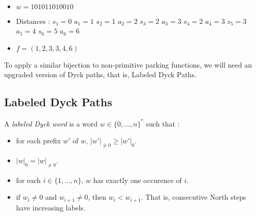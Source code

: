 \begin{example}[$n = 6, \mathcal{D}_n \to \mathcal{PF'}_n$]
    ~\
    \begin{itemize}
        \item $w = 101011010010$
    \end{itemize}
    
    \begin{itemize}
        \item Distances : 
            \subitem $s_1 = 0$
                \hspace{2cm} $a_1 = 1$
            \subitem $s_2 = 1$
                \hspace{2cm} $a_2 = 2$
            \subitem $s_3 = 2$
                \hspace{2cm} $a_3 = 3$
            \subitem $s_4 = 2$
                \hspace{2cm} $a_4 = 3$
            \subitem $s_5 = 3$
                \hspace{2cm} $a_5 = 4$
            \subitem $s_6 = 5$
                \hspace{2cm} $a_6 = 6$
        \item $f = (1, 2, 3, 3, 4, 6)$
    \end{itemize}
    
\end{example}

To apply a similar bijection to non-primitive parking
functions, we will need an upgraded version of Dyck paths,
that is, Labeled Dyck Paths.

\subsection{Labeled Dyck Paths}

\begin{definition}
    A \emph{labeled Dyck word} is a word $w \in 
    \{0, \ldots, n\}^*$ such that :
    \begin{itemize}
        \item for each prefix $w'$ of $w$,
            $|w'|_{\neq 0} \geqslant |w'|_0$.
        \item $|w|_0 = |w|_{\neq 0}$.
        \item for each $i \in \{1, \ldots, n\}$, $w$ has 
            exactly one occurence of $i$.
        \item if $w_i \neq 0$ and $w_{i+1} \neq 0$,
            then $w_i < w_{i+1}$. That is, consecutive
            North steps have increasing labels.
    \end{itemize}
\end{definition}

